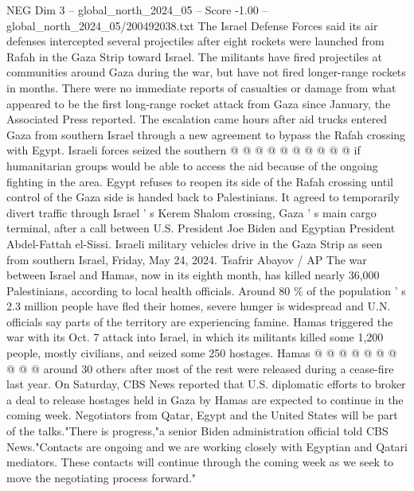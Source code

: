 \begin{textsample}{NEG Dim 3 – global\_north\_2024\_05 – Score -1.00 – global\_north\_2024\_05/200492038.txt}
The Israel Defense Forces said its air defenses intercepted several projectiles after eight rockets were launched from Rafah in the Gaza Strip toward Israel.
The militants have fired projectiles at communities around Gaza during the war, but have not fired longer-range rockets in months.
There were no immediate reports of casualties or damage from what appeared to be the first long-range rocket attack from Gaza since January, the Associated Press reported.
The escalation came hours after aid trucks entered Gaza from southern Israel through a new agreement to bypass the Rafah crossing with Egypt.
Israeli forces seized the southern @ @ @ @ @ @ @ @ @ @ if humanitarian groups would be able to access the aid because of the ongoing fighting in the area.
Egypt refuses to reopen its side of the Rafah crossing until control of the Gaza side is handed back to Palestinians.
It agreed to temporarily divert traffic through Israel ' s Kerem Shalom crossing, Gaza ' s main cargo terminal, after a call between U.S.
President Joe Biden and Egyptian President Abdel-Fattah el-Sissi.
Israeli military vehicles drive in the Gaza Strip as seen from southern Israel, Friday, May 24, 2024.
Tsafrir Abayov / AP The war between Israel and Hamas, now in its eighth month, has killed nearly 36,000 Palestinians, according to local health officials.
Around 80 \% of the population ' s 2.3 million people have fled their homes, severe hunger is widespread and U.N. officials say parts of the territory are experiencing famine.
Hamas triggered the war with its Oct. 7 attack into Israel, in which its militants killed some 1,200 people, mostly civilians, and seized some 250 hostages.
Hamas @ @ @ @ @ @ @ @ @ @ around 30 others after most of the rest were released during a cease-fire last year.
On Saturday, CBS News reported that U.S. diplomatic efforts to broker a deal to release hostages held in Gaza by Hamas are expected to continue in the coming week.
Negotiators from Qatar, Egypt and the United States will be part of the talks."There is progress,"a senior Biden administration official told CBS News."Contacts are ongoing and we are working closely with Egyptian and Qatari mediators.
These contacts will continue through the coming week as we seek to move the negotiating process forward."

\end{textsample}
